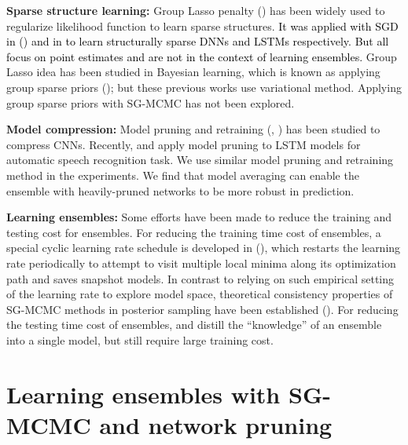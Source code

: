 \documentclass{article} %
\newcommand{\ozj}{\textcolor{black}}
\begin{document}
\textbf{Sparse structure learning:} 
Group Lasso penalty (\citet{yuan2006model}) has been widely used to regularize likelihood function to learn sparse structures.
\ozj{It was applied with SGD in (\cite{wen2016learning,alvarez2016learning}) and in \citet{wen2017learning} to learn structurally sparse DNNs and LSTMs respectively. But all focus on point estimates and are not in the context of learning ensembles.}
Group Lasso idea has been studied in Bayesian learning, which is known as applying group sparse priors (\citet{marlin2009group,babacan2014bayesian}); but these previous works use variational method. Applying group sparse priors with SG-MCMC has not been explored.

\textbf{Model compression:}
Model pruning and retraining (\citet{han2015deep}, \citet{hu2016network}) has been studied to compress CNNs.
Recently, \citet{han2017ese} and \citet{narang2017exploring} apply model pruning to LSTM models for automatic speech recognition task. 
We use similar model pruning and retraining method in the experiments.
We find that model averaging can enable the ensemble with heavily-pruned networks to be more robust in prediction.

\textbf{Learning ensembles:} Some efforts have been made to reduce the training and testing cost for ensembles.
For reducing the training time cost of ensembles, a special cyclic learning rate schedule is developed in (\citet{loshchilov2016sgdr,huang2017snapshot}), which restarts the learning rate periodically to attempt to visit multiple local minima along its optimization path and saves snapshot models. 
In contrast to relying on such empirical setting of the learning rate to explore model space, theoretical consistency properties of SG-MCMC methods in posterior sampling have been established (\citet{teh2016consistency}).
For reducing the testing time cost of ensembles,  \citet{hinton2015distilling} and \citet{balan2015bayesian} 
distill the “knowledge” of an ensemble into a single model, but still require large training cost.

\section{Learning ensembles with SG-MCMC and network pruning}
\label{learning}
\end{document}
